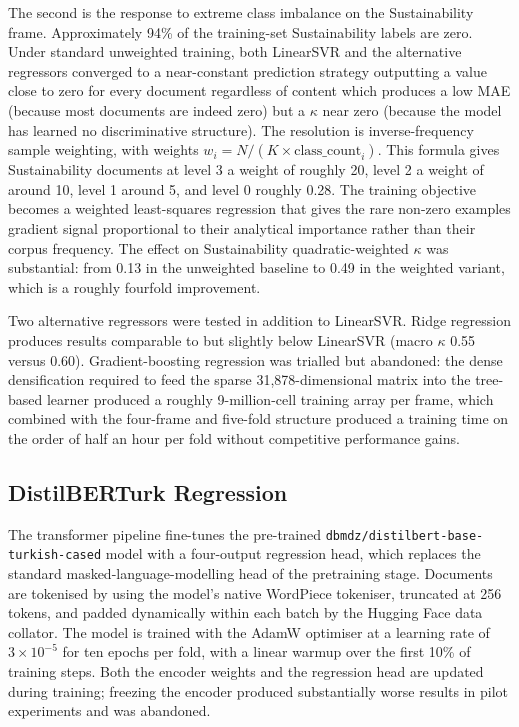 \documentclass[12pt, journal]{IEEEtran}
\begin{document}
The second is the response to extreme class imbalance on the Sustainability frame. Approximately 94\% of the training-set Sustainability labels are zero. Under standard unweighted training, both LinearSVR and the alternative regressors converged to a near-constant prediction strategy outputting a value close to zero for every document regardless of content which produces a low MAE (because most documents are indeed zero) but a $\kappa$ near zero (because the model has learned no discriminative structure). The resolution is inverse-frequency sample weighting, with weights $w_i = N / (K \times \mathrm{class\_count}_i)$. This formula gives Sustainability documents at level 3 a weight of roughly 20, level 2 a weight of around 10, level 1 around 5, and level 0 roughly 0.28. The training objective becomes a weighted least-squares regression that gives the rare non-zero examples gradient signal proportional to their analytical importance rather than their corpus frequency. The effect on Sustainability quadratic-weighted $\kappa$ was substantial: from 0.13 in the unweighted baseline to 0.49 in the weighted variant, which is a roughly fourfold improvement.

Two alternative regressors were tested in addition to LinearSVR. Ridge regression produces results comparable to but slightly below LinearSVR (macro $\kappa$ 0.55 versus 0.60). Gradient-boosting regression was trialled but abandoned: the dense densification required to feed the sparse 31,878-dimensional matrix into the tree-based learner produced a roughly 9-million-cell training array per frame, which combined with the four-frame and five-fold structure produced a training time on the order of half an hour per fold without competitive performance gains.

\subsection{DistilBERTurk Regression}
The transformer pipeline fine-tunes the pre-trained \texttt{dbmdz/distilbert-base-turkish-cased} model with a four-output regression head, which replaces the standard masked-language-modelling head of the pretraining stage. Documents are tokenised by using the model's native WordPiece tokeniser, truncated at 256 tokens, and padded dynamically within each batch by the Hugging Face data collator. The model is trained with the AdamW optimiser at a learning rate of $3 \times 10^{-5}$ for ten epochs per fold, with a linear warmup over the first 10\% of training steps. Both the encoder weights and the regression head are updated during training; freezing the encoder produced substantially worse results in pilot experiments and was abandoned.
\end{document}
